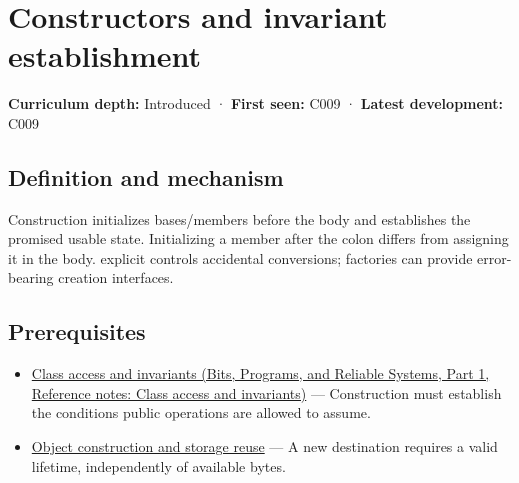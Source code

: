 \hypertarget{appendix-7f8ec83d0886}{}\label{referencestart:appendix-7f8ec83d0886}
\section{Constructors and invariant establishment}\label{appendix-7f8ec83d0886-constructors-and-invariant-establishment}

\hypertarget{appendix-7f8ec83d0886-constructors-and-invariant-establishment}{}

\textbf{Curriculum depth:} Introduced · \textbf{First seen:} C009 · \textbf{Latest development:} C009

\begin{allmightroledefinition}

\subsection{Definition and mechanism}\label{appendix-7f8ec83d0886-definition-and-mechanism}

\hypertarget{appendix-7f8ec83d0886-definition-and-mechanism}{}

Construction initializes bases/members before the body and establishes the promised usable state. Initializing a member after the colon differs from assigning it in the body. explicit controls accidental conversions; factories can provide error-bearing creation interfaces.

\end{allmightroledefinition}

\subsection{Prerequisites}\label{appendix-7f8ec83d0886-prerequisites}

\hypertarget{appendix-7f8ec83d0886-prerequisites}{}

\begin{itemize}
\tightlist
\item
  \href{../01-Bits-Programs-and-Reliable-Systems-P01/main.pdf\#appendix-8e5214819615}{Class access and invariants (Bits, Programs, and Reliable Systems, Part 1, Reference notes: Class access and invariants)} --- Construction must establish the conditions public operations are allowed to assume.
\item
  \hyperref[appendix-a82f9c438857]{Object construction and storage reuse} --- A new destination requires a valid lifetime, independently of available bytes.
\end{itemize}

